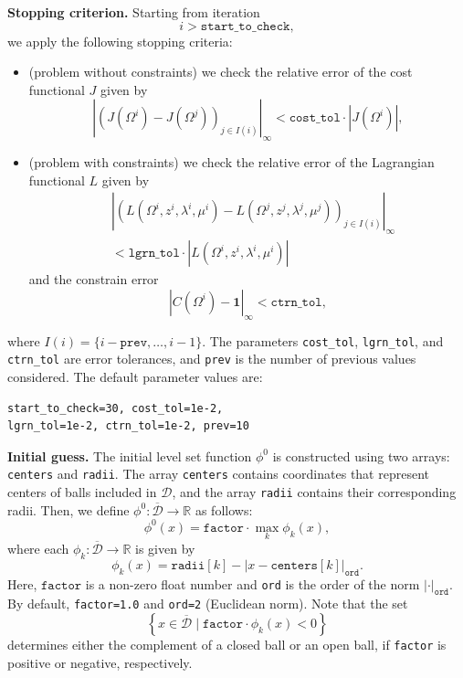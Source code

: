 \documentclass[iicol,pdflatex,sn-mathphys-ay]{sn-jnl}%
\theoremstyle{thmstyleone}%
\theoremstyle{thmstyletwo}%
\theoremstyle{thmstylethree}%
\begin{document}
\vspace*{0.5cm}
\noindent \textbf{Stopping criterion.}
Starting from iteration
\[
i>\texttt{start\_to\_check},
\]
we apply the following stopping criteria:
\begin{itemize}
	\item (problem without constraints) we check the relative error of
	the cost functional $J$ given by
	\[
		\left|(J(\Omega^i)-J(\Omega^j))_{j\in I(i)}\right|_{\infty}
		<\texttt{cost\_tol}\cdot |J(\Omega^i)|,
	\]
	\item (problem with constraints) we check the relative error of
	the Lagrangian functional $L$ given by
	\[
	\begin{aligned}
		&\left|
		(
		L(\Omega^i, z^i, \lambda^i, \mu^i)-L(\Omega^j, z^j,\lambda^j,\mu^j)
		)_{j\in I(i)}
		\right|_\infty\\
		&<\texttt{lgrn\_tol}\cdot|L(\Omega^i,z^i,\lambda^i,\mu^i)|
	\end{aligned}
	\]
	and the constrain error
	\[
		|C(\Omega^i)-\textbf{1}|_\infty<\texttt{ctrn\_tol},
	\]
\end{itemize}
where $I(i) = \{i-\texttt{prev}, \dots,i-1\}$.
The parameters \texttt{cost\_tol}, \texttt{lgrn\_tol}, and \texttt{ctrn\_tol} 
are error tolerances, and \texttt{prev} is
the number of previous values considered.
The default parameter values are:
\begin{lstlisting}
start_to_check=30, cost_tol=1e-2,
lgrn_tol=1e-2, ctrn_tol=1e-2, prev=10	
\end{lstlisting}

\vspace*{0.5cm}
\noindent \textbf{Initial guess.}
The initial level set function $\phi^0$ is constructed
using two arrays:  \texttt{centers} and \texttt{radii}.
The array \texttt{centers} contains coordinates that
represent centers of balls included in $\mathcal{D}$,
and the array \texttt{radii} contains their corresponding radii.
Then, we define $\phi^0\colon\mathcal{\overline{D}}\to\mathds{R}$ as follows:
\begin{equation}\label{eq:phi0}
	\phi^0(x)=\texttt{factor}\cdot\max_k \phi_k(x),	
\end{equation}
where each $\phi_k\colon\mathcal{\overline{D}}\to\mathds{R}$ is given by
\[
	\phi_k(x)=\texttt{radii}[k] -
	|x-\texttt{centers}[k]|_{\texttt{ord}}. 
\]
Here, $\texttt{factor}$ is a non-zero float number and \texttt{ord}
is the order of the norm $\left|\cdot\right|_{\texttt{ord}}$.
By default, \texttt{factor=1.0} and \texttt{ord=2} (Euclidean norm).
Note that the set
\[
	\left\{x\in\overline{\mathcal{D}}\mid\texttt{factor}\cdot\phi_k(x)<0\right\}
\]
determines either the complement of a closed ball
or an open ball, if \texttt{factor} is positive or negative, respectively.
\end{document}
